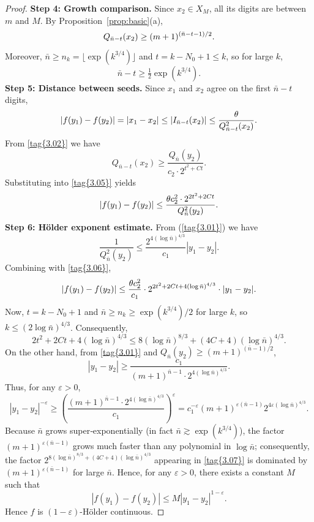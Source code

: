 \documentclass{article}
\numberwithin{equation}{section}
\begin{document}
{\begin{proof}
\noindent\textbf{Step 4: Growth comparison.}
Since $x_2 \in X_M$, all its digits are between $m$ and $M$. By Proposition~\ref{prop:basic}(a),
\begin{equation}
Q_{\bar{n}-t}(x_2) \geq (m+1)^{(\bar{n}-t-1)/2}. \label{tag{3.03}}
\end{equation}
Moreover, $\bar{n} \geq n_k = \lfloor \exp(k^{3/4})\rfloor$ and $t = k - N_0 + 1 \leq k$, so for large $k$,
\[
\bar{n}-t \geq \tfrac12 \exp(k^{3/4}).
\]
%
\noindent\textbf{Step 5: Distance between seeds.}
Since $x_1$ and $x_2$ agree on the first $\bar{n}-t$ digits,
\begin{equation}
|f(y_1)-f(y_2)| = |x_1-x_2| \leq |I_{\bar{n}-t}(x_2)|
 \leq \frac{\theta}{Q_{\bar{n}-t}^{2}(x_2)}. \label{tag{3.05}}
\end{equation}
From \eqref{tag{3.02}} we have
\[
Q_{\bar{n}-t}(x_2) \geq \frac{Q_{\bar{n}}(y_2)}{c_2 \cdot 2^{t^{2}+Ct}}.
\]
Substituting into \eqref{tag{3.05}} yields
\begin{equation}
|f(y_1)-f(y_2)| \leq \frac{\theta c_2^2 \cdot 2^{2t^{2}+2Ct}}{Q_{\bar{n}}^2(y_2)}. \label{tag{3.06}}
\end{equation}
%
\noindent\textbf{Step 6: Hölder exponent estimate.}
From (\ref{tag{3.01}}) we have
\[
\frac{1}{Q_{\bar{n}}^2(y_2)} \leq \frac{2^{4(\log \bar{n})^{4/3}}}{c_1} |y_1-y_2|.
\]
Combining with \eqref{tag{3.06}},
\begin{equation}
|f(y_1)-f(y_2)| \leq \frac{\theta c_2^2}{c_1} \cdot 2^{2t^{2}+2Ct+4(\log \bar{n})^{4/3}} \cdot |y_1-y_2|. \label{tag{3.07}}
\end{equation}
Now, $t = k - N_0 + 1$ and $\bar{n} \geq n_k \geq \exp(k^{3/4})/2$ for large $k$, so $k \leq (2\log \bar{n})^{4/3}$. Consequently,
\[
2t^{2}+2Ct+4(\log \bar{n})^{4/3} \leq 8 (\log \bar{n})^{8/3} + (4C+4)(\log \bar{n})^{4/3}.
\]
On the other hand, from \eqref{tag{3.01}} and $Q_{\bar{n}}(y_2) \geq (m+1)^{(\bar{n}-1)/2}$,
\[
|y_1-y_2| \geq \frac{c_1}{(m+1)^{\bar{n}-1} \cdot 2^{4(\log \bar{n})^{4/3}}}.
\]
Thus, for any $\varepsilon > 0$,
\[
|y_1-y_2|^{-\varepsilon} \geq \left( \frac{(m+1)^{\bar{n}-1} \cdot 2^{4(\log \bar{n})^{4/3}}}{c_1} \right)^{\varepsilon}
= c_1^{-\varepsilon} (m+1)^{\varepsilon(\bar{n}-1)} 2^{4\varepsilon(\log \bar{n})^{4/3}}.
\]
Because $\bar{n}$ grows super‑exponentially (in fact $\bar{n} \gtrsim \exp(k^{3/4})$), the factor $(m+1)^{\varepsilon(\bar{n}-1)}$ grows much faster than any polynomial in $\log \bar{n}$; consequently, the factor $2^{8 (\log \bar{n})^{8/3} + (4C+4)(\log \bar{n})^{4/3}}$ appearing in \eqref{tag{3.07}} is dominated by $(m+1)^{\varepsilon(\bar{n}-1)}$ for large $\bar{n}$. Hence, for any $\varepsilon > 0$, there exists a constant $M$ such that
\[
|f(y_1)-f(y_2)| \leq M |y_1-y_2|^{1-\varepsilon}.
\]
Hence $f$ is $(1-\varepsilon)$-Hölder continuous.
\end{proof}
}
\end{document}
